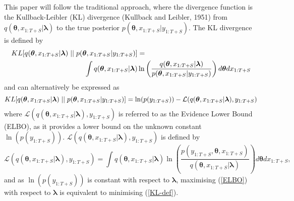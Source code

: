 \documentclass[12pt,a4paper]{article}%
\numberwithin{equation}{section}
\begin{document}
This paper will follow the traditional approach, where the divergence function is the Kullback-Leibler (KL) divergence (Kullback and Leibler, 1951) from $q(\boldsymbol{\theta}, x_{1:T+S}| \boldsymbol{\lambda})$ to the true posterior $p(\boldsymbol{\theta}, x_{1:T+S} | y_{1:T+S})$. The KL divergence is defined by
\begin{align}
\label{KL-def}
KL[q(\boldsymbol{\theta}, x_{1:T+S}| \boldsymbol{\lambda})\hspace{.1cm}||\hspace{.1cm}p(\boldsymbol{\theta}, x_{1:T+S} | y_{1:T+S})] &= \nonumber \\
\int q(\boldsymbol{\theta}, x_{1:T+S} | \boldsymbol{\lambda}) &\ln \left( \frac{q(\boldsymbol{\theta}, x_{1:T+S} | \boldsymbol{\lambda})}{p(\boldsymbol{\theta}, x_{1:T+S} |y_{1:T+S})}\right) d\boldsymbol{\theta} dx_{1:T+S}
\end{align}
and can alternatively be expressed as
\begin{equation}
\label{KL-ELBO}
KL[q(\boldsymbol{\theta}, x_{1:T+S} | \boldsymbol{\lambda})\hspace{.1cm}||\hspace{.1cm}p(\boldsymbol{\theta}, x_{1:T+S} | y_{1:T+S})] = \ln(p(y_{1:T+S})) - \mathcal{L}(q(\boldsymbol{\theta}, x_{1:T+S} | \boldsymbol{\lambda}), y_{1:T+S})
\end{equation}
where $\mathcal{L}(q(\boldsymbol{\theta}, x_{1:T+S} | \boldsymbol{\lambda}), y_{1:T+S})$ is referred to as the Evidence Lower Bound (ELBO), as it provides a lower bound on the unknown constant $\ln(p(y_{1:T+S}))$.  $\mathcal{L}(q(\boldsymbol{\theta}, x_{1:T+S} | \boldsymbol{\lambda}), y_{1:T+S})$ is defined by
\begin{equation}
\label{ELBO}
\mathcal{L}(q(\boldsymbol{\theta}, x_{1:T+S} | \boldsymbol{\lambda}), y_{1:T+S}) = \int q(\boldsymbol{\theta}, x_{1:T+S} | \boldsymbol{\lambda}) \ln \left( \frac{p(y_{1:T+S},\boldsymbol{\theta}, x_{1:T+S})}{q(\boldsymbol{\theta}, x_{1:T+S} | \boldsymbol{\lambda})} \right) d\boldsymbol{\theta}dx_{1:T+S},
\end{equation}
and as $\ln(p(y_{1:T+S}))$ is constant with respect to $\boldsymbol{\lambda}$, maximising (\ref{ELBO}) with respect to $\boldsymbol{\lambda}$ is equivalent to minimising (\ref{KL-def}). 
\end{document}
